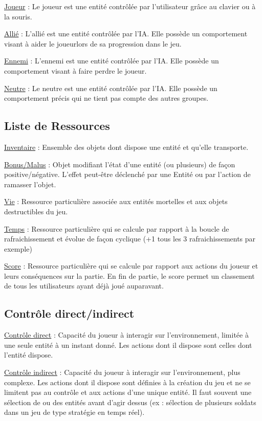 \underline{Joueur} :
Le joueur est une entité contrôlée par l'utilisateur grâce au clavier ou à la souris.

\underline{Allié} :
L'allié est une entité contrôlée par l'IA. Elle possède un comportement visant à aider le joueurlors de sa progression dans le jeu.

\underline{Ennemi} :
L'ennemi est une entité contrôlée par l'IA. Elle possède un comportement visant à faire perdre le joueur.

\underline{Neutre} :
Le neutre est une entité contrôlée par l'IA. Elle possède un comportement précis qui ne tient pas compte des autres groupes.


\subsection*{Liste de Ressources}

\underline{Inventaire} : 
Ensemble des objets dont dispose une entité et qu'elle transporte.

\underline{Bonus/Malus} :
Objet modifiant l'état d'une entité (ou plusieurs) de façon positive/négative. L'effet peut-être déclenché par une Entité ou par l'action de ramasser l'objet.

\underline{Vie} : 
Ressource particulière associée aux entités mortelles et aux objets destructibles du jeu.

\underline{Temps} :
Ressource particulière qui se calcule par rapport à la boucle de rafraichissement et évolue de façon cyclique (+1 tous les 3 rafraichissements par exemple)

\underline{Score} :
Ressource particulière qui se calcule par rapport aux actions du joueur et leurs conséquences sur la partie.
En fin de partie, le score permet un classement de tous les utilisateurs ayant déjà joué auparavant.

\subsection*{Contrôle direct/indirect}

\underline{Contrôle direct} :
Capacité du joueur à interagir sur l’environnement, limitée à une seule entité à un instant donné. 
Les actions dont il dispose sont celles dont l'entité dispose.

\underline{Contrôle indirect} :
Capacité du joueur à interagir sur l’environnement, plus complexe. 
Les actions dont il dispose sont définies à la création du jeu et ne se limitent pas au contrôle et aux actions d'une unique entité.
Il faut souvent une sélection de ou des entités avant d'agir dessus (ex : sélection de plusieurs soldats dans un jeu de type stratégie en temps réel).

